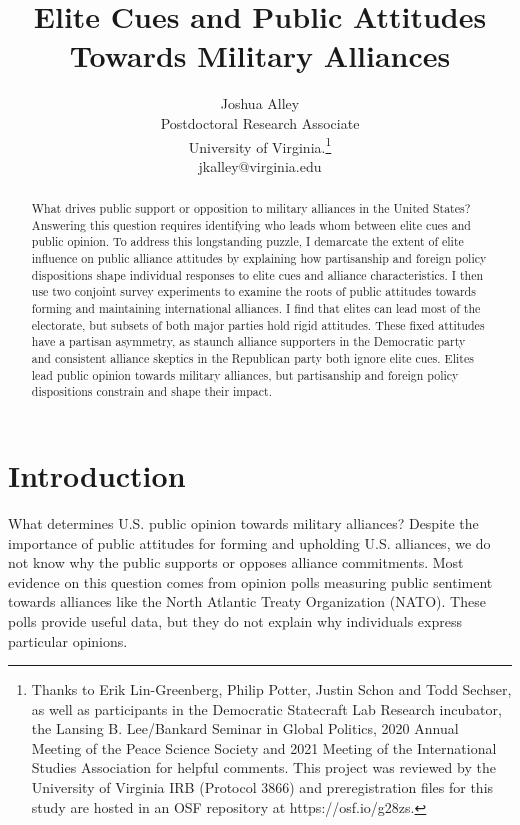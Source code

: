 \documentclass[12pt]{article}
\title{\textbf{Elite Cues and Public Attitudes Towards Military Alliances}}
\author{Joshua Alley \\
Postdoctoral Research Associate \\
University of Virginia.\thanks{Thanks to Erik Lin-Greenberg, Philip Potter, Justin Schon and Todd Sechser, as well as participants in the Democratic Statecraft Lab Research incubator, the Lansing B. Lee/Bankard Seminar in Global Politics, 2020 Annual Meeting of the Peace Science Society and 2021 Meeting of the International Studies Association for helpful comments. This project was reviewed by the University of Virginia IRB (Protocol 3866) and preregistration files for this study are hosted in an OSF repository at https://osf.io/g28zs.} \\
jkalley@virginia.edu
}
\date{}
\begin{document}
\maketitle 

\doublespace 

\begin{abstract}
What drives public support or opposition to military alliances in the United States? 
Answering this question requires identifying who leads whom between elite cues and public opinion.  
To address this longstanding puzzle, I demarcate the extent of elite influence on public alliance attitudes by explaining how partisanship and foreign policy dispositions shape individual responses to elite cues and alliance characteristics. 
I then use two conjoint survey experiments to examine the roots of public attitudes towards forming and maintaining international alliances.  
I find that elites can lead most of the electorate, but subsets of both major parties hold rigid attitudes. 
These fixed attitudes have a partisan asymmetry, as staunch alliance supporters in the Democratic party and consistent alliance skeptics in the Republican party both ignore elite cues.  
Elites lead public opinion towards military alliances, but partisanship and foreign policy dispositions constrain and shape their impact.  
\end{abstract}


\newpage 


\section{Introduction}

What determines U.S. public opinion towards military alliances? 
Despite the importance of public attitudes for forming and upholding U.S. alliances, we do not know why the public supports or opposes alliance commitments. 
Most evidence on this question comes from opinion polls measuring public sentiment towards alliances like the North Atlantic Treaty Organization (NATO).
These polls provide useful data, but they do not explain why individuals express particular opinions. 
\end{document}
